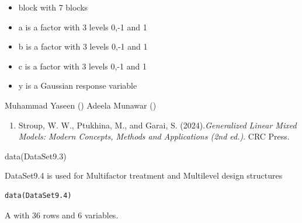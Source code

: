 \documentclass[a4paper]{book}
\begin{document}
%
\begin{Details}
\begin{itemize}

\item{} block  with 7 blocks
\item{} a      is a factor with 3 levels 0,-1 and 1
\item{} b      is a factor with 3 levels 0,-1 and 1
\item{} c      is a factor with 3 levels 0,-1 and 1
\item{} y      is a Gaussian response variable

\end{itemize}

\end{Details}
%
\begin{Author}
Muhammad Yaseen ()
Adeela Munawar ()
\end{Author}
%
\begin{References}
\begin{enumerate}

\item{} Stroup, W. W., Ptukhina, M., and Garai, S. (2024).\emph{Generalized Linear Mixed Models: Modern Concepts, Methods and Applications (2nd ed.)}.
CRC Press.

\end{enumerate}

\end{References}
%
\begin{SeeAlso}
\end{SeeAlso}
%
\begin{Examples}
\begin{ExampleCode}
data(DataSet9.3)
\end{ExampleCode}
\end{Examples}
%
\begin{Description}
DataSet9.4 is used for Multifactor treatment and Multilevel design structures
\end{Description}
%
\begin{Usage}
\begin{verbatim}
data(DataSet9.4)
\end{verbatim}
\end{Usage}
%
\begin{Format}
A  with 36 rows and 6 variables.
\end{Format}
\end{document}
